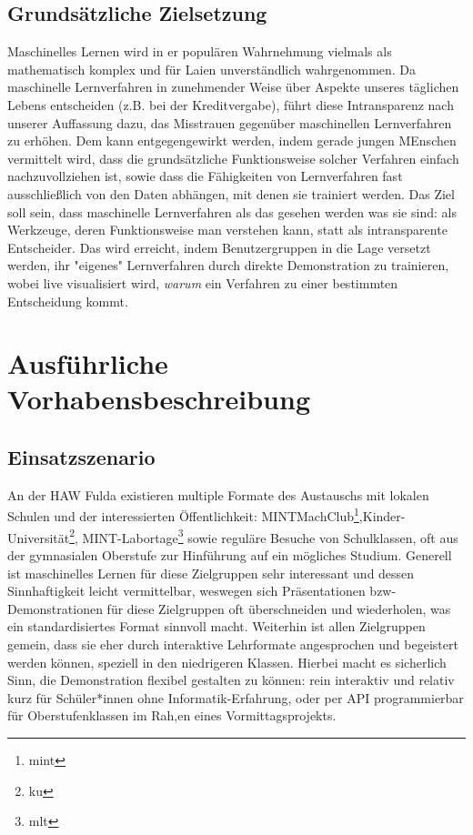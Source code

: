 \documentclass{article}
\begin{document}
\subsection{Grundsätzliche Zielsetzung}
%
Maschinelles Lernen wird in er populären Wahrnehmung vielmals als mathematisch komplex und für Laien unverständlich wahrgenommen. Da maschinelle Lernverfahren in zunehmender Weise über Aspekte unseres täglichen Lebens entscheiden (z.B. bei der Kreditvergabe), führt diese Intransparenz nach unserer Auffassung dazu, das Misstrauen gegenüber maschinellen Lernverfahren zu erhöhen. Dem kann entgegengewirkt werden, indem gerade jungen MEnschen vermittelt wird, dass
die grundsätzliche Funktionsweise solcher Verfahren einfach nachzuvollziehen ist, sowie dass die Fähigkeiten von Lernverfahren fast ausschließlich von den Daten abhängen, mit denen sie trainiert werden. Das Ziel soll sein, dass maschinelle Lernverfahren als das gesehen werden was sie sind: als Werkzeuge, deren Funktionsweise man verstehen kann, statt als intransparente Entscheider. 
Das wird erreicht, indem Benutzergruppen in die Lage versetzt werden, ihr "eigenes" Lernverfahren durch direkte Demonstration zu trainieren, wobei live visualisiert wird, {\it warum} ein Verfahren zu einer bestimmten Entscheidung kommt.
%
\renewcommand{\thesection}{4}
\section{Ausführliche Vorhabensbeschreibung}\label{sec:besch}
\subsection{Einsatzszenario}
An der HAW Fulda existieren multiple Formate des Austauschs mit lokalen Schulen und der interessierten Öffentlichkeit: MINTMachClub\footnote{mint},Kinder-Universität\footnote{ku}, MINT-Labortage\footnote{mlt} sowie
reguläre Besuche von Schulklassen, oft aus der gymnasialen Oberstufe zur Hinführung auf ein mögliches Studium. Generell ist maschinelles Lernen für diese Zielgruppen sehr interessant und dessen Sinnhaftigkeit leicht vermittelbar, weswegen sich Präsentationen bzw- Demonstrationen für diese Zielgruppen oft überschneiden und wiederholen, was ein standardisiertes Format sinnvoll macht. 
Weiterhin ist allen Zielgruppen gemein, dass sie eher durch interaktive Lehrformate angesprochen und begeistert werden können, speziell in den niedrigeren Klassen. Hierbei macht es sicherlich Sinn, die Demonstration flexibel gestalten zu können:
rein interaktiv und relativ kurz für Schüler*innen ohne Informatik-Erfahrung, oder per API programmierbar für Oberstufenklassen im Rah,en eines Vormittagsprojekts. 
%
\end{document}

